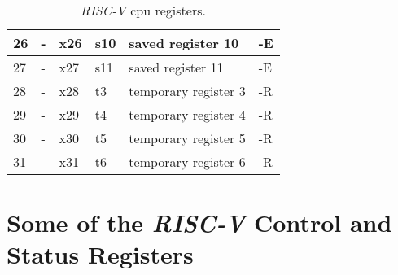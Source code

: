 \begin{table}[!ht]
{\begin{tabular}{|l|l|l|l|l|l|}
  26                                                                      & -                                                                                   & x26               & s10               & saved register 10                                                               & -E                       \\ \hline
  27                                                                      & -                                                                                   & x27               & s11               & saved register 11                                                               & -E                       \\ \hline
  28                                                                      & -                                                                                   & x28               & t3                & temporary register 3                                                            & -R                       \\ \hline
  29                                                                      & -                                                                                   & x29               & t4                & temporary register 4                                                            & -R                       \\ \hline
  30                                                                      & -                                                                                   & x30               & t5                & temporary register 5                                                            & -R                       \\ \hline
  31                                                                      & -                                                                                   & x31               & t6                & temporary register 6                                                            & -R                       \\ \hline
  \end{tabular}}
  \caption{\textit{RISC-V} \acrshort{cpu} registers.}
  \label{tab:riscv_cpu_registers}
\end{table}

\clearpage

\section{Some of the \textit{RISC-V} Control and Status Registers}
\label{appendix:riscv_essencial_csr}

